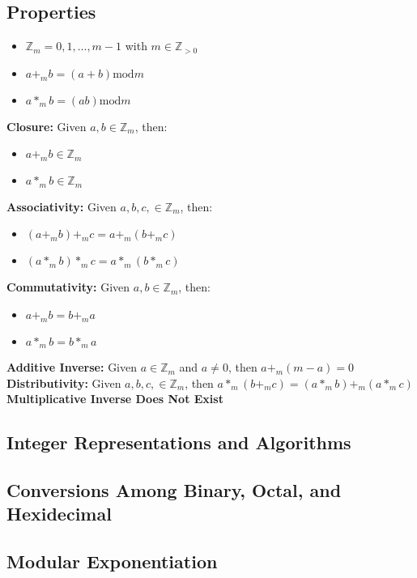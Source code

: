 \documentclass[letter]{article}
\begin{document}
\begin{multicols}{2}
  \subsection{Properties}
  \begin{itemize}
	  \item $\mathbb{Z}_m = {0, 1, ..., m- 1}$ with $ m\in \mathbb{Z}_{>0}$
	  \item $a+_mb = (a + b)\text{mod}m$
	  \item $a*_mb = (ab)\text{mod}m$ 
  \end{itemize}
  \textbf{Closure:} Given $a, b \in \mathbb{Z}_m$, then:
  \begin{itemize}
	  \item $a+_mb \in \mathbb{Z}_m$
	  \item $a*_mb \in \mathbb{Z}_m$
  \end{itemize}
  \textbf{Associativity:} Given $a, b, c, \in \mathbb{Z}_m$, then:
  \begin{itemize}
  	\item $(a +_mb)+_mc = a+_m(b+_mc)$
	\item $(a *_mb)*_mc = a*_m(b*_mc)$
  \end{itemize}
  \textbf{Commutativity:} Given $a, b \in \mathbb{Z}_m$, then:
  \begin{itemize}
	  \item $a+_mb = b+_ma$
	  \item $a*_mb = b*_ma$
  \end{itemize}
  \textbf{Additive Inverse:} Given $a \in \mathbb{Z}_m$ and $a \neq 0$, then $a+_m(m - a) = 0$\\
  \textbf{Distributivity:} Given $a, b, c, \in \mathbb{Z}_m$, then $a*_m(b+_mc) = (a*_mb) +_m (a*_mc)$\\
  \textbf{Multiplicative Inverse Does Not Exist}

  \subsection{Integer Representations and Algorithms}
  \subsection{Conversions Among Binary, Octal, and Hexidecimal}
  \subsection{Modular Exponentiation}


\end{multicols}
\end{document}
